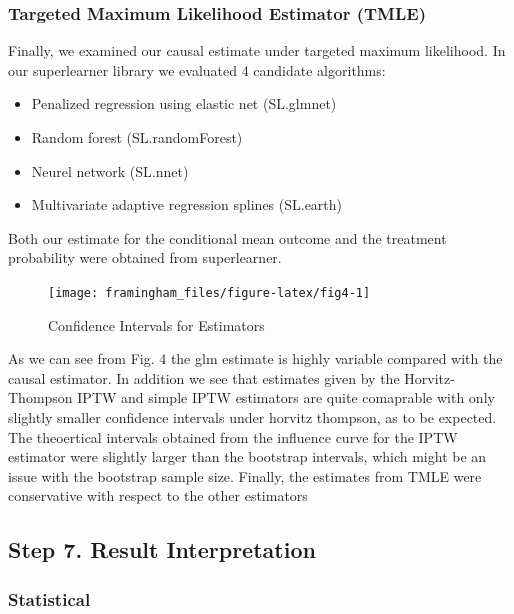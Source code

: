 \documentclass[]{article}
\begin{document}
\hypertarget{targeted-maximum-likelihood-estimator-tmle}{%
\subsubsection{Targeted Maximum Likelihood Estimator
(TMLE)}\label{targeted-maximum-likelihood-estimator-tmle}}

Finally, we examined our causal estimate under targeted maximum
likelihood. In our superlearner library we evaluated 4 candidate
algorithms:

\begin{itemize}
\item Penalized regression using elastic net (SL.glmnet)
\item Random forest (SL.randomForest)
\item Neurel network (SL.nnet)
\item Multivariate adaptive regression splines (SL.earth)
\end{itemize}

Both our estimate for the conditional mean outcome and the treatment
probability were obtained from superlearner.

\begin{figure}[H]

{\centering \texttt{[image: framingham\_files/figure-latex/fig4-1]} 

}

\caption{Confidence Intervals for Estimators}\label{fig:fig4}
\end{figure}

As we can see from Fig. 4 the glm estimate is highly variable compared
with the causal estimator. In addition we see that estimates given by
the Horvitz-Thompson IPTW and simple IPTW estimators are quite
comaprable with only slightly smaller confidence intervals under horvitz
thompson, as to be expected. The theoertical intervals obtained from the
influence curve for the IPTW estimator were slightly larger than the
bootstrap intervals, which might be an issue with the bootstrap sample
size. Finally, the estimates from TMLE were conservative with respect to
the other estimators

\hypertarget{step-7.-result-interpretation}{%
\subsection{Step 7. Result
Interpretation}\label{step-7.-result-interpretation}}

\hypertarget{statistical}{%
\subsubsection{Statistical}\label{statistical}}
\end{document}
